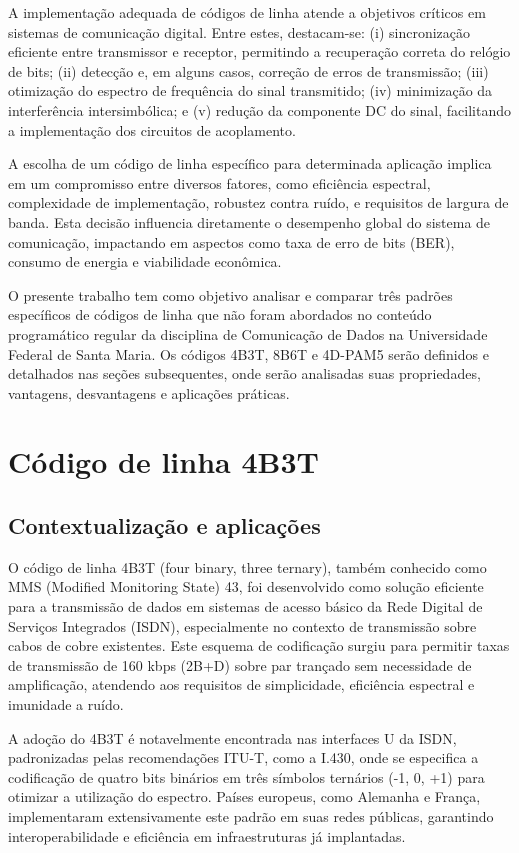 \documentclass[conference]{IEEEtran}
\begin{document}
A implementação adequada de códigos de linha atende a objetivos críticos em sistemas de comunicação digital. Entre estes, destacam-se: (i) sincronização eficiente entre transmissor e receptor, permitindo a recuperação correta do relógio de bits; (ii) detecção e, em alguns casos, correção de erros de transmissão; (iii) otimização do espectro de frequência do sinal transmitido; (iv) minimização da interferência intersimbólica; e (v) redução da componente DC do sinal, facilitando a implementação dos circuitos de acoplamento.

A escolha de um código de linha específico para determinada aplicação implica em um compromisso entre diversos fatores, como eficiência espectral, complexidade de implementação, robustez contra ruído, e requisitos de largura de banda. Esta decisão influencia diretamente o desempenho global do sistema de comunicação, impactando em aspectos como taxa de erro de bits (BER), consumo de energia e viabilidade econômica.

O presente trabalho tem como objetivo analisar e comparar três padrões específicos de códigos de linha que não foram abordados no conteúdo programático regular da disciplina de Comunicação de Dados na Universidade Federal de Santa Maria. Os códigos 4B3T, 8B6T e 4D-PAM5 serão definidos e detalhados nas seções subsequentes, onde serão analisadas suas propriedades, vantagens, desvantagens e aplicações práticas.



\section{Código de linha 4B3T}

\subsection{Contextualização e aplicações}

O código de linha 4B3T (four binary, three ternary), também conhecido como MMS (Modified Monitoring State) 43, foi desenvolvido como solução eficiente para a transmissão de dados em sistemas de acesso básico da Rede Digital de Serviços Integrados (ISDN), especialmente no contexto de transmissão sobre cabos de cobre existentes. Este esquema de codificação surgiu para permitir taxas de transmissão de 160 kbps (2B+D) sobre par trançado sem necessidade de amplificação, atendendo aos requisitos de simplicidade, eficiência espectral e imunidade a ruído.

A adoção do 4B3T é notavelmente encontrada nas interfaces U da ISDN, padronizadas pelas recomendações ITU-T, como a I.430, onde se especifica a codificação de quatro bits binários em três símbolos ternários (-1, 0, +1) para otimizar a utilização do espectro. Países europeus, como Alemanha e França, implementaram extensivamente este padrão em suas redes públicas, garantindo interoperabilidade e eficiência em infraestruturas já implantadas.
\end{document}
